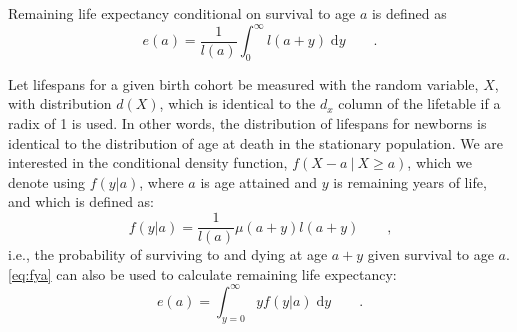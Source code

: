 \documentclass{article}
\newcommand{\dd}{\; \mathrm{d}}
\newcommand{\tc}{\quad\quad\text{,}}
\newcommand{\tp}{\quad\quad\text{.}}
\begin{document}
Remaining life expectancy conditional on survival to age $a$ is defined as
\begin{equation}
e(a) = \frac{1}{l(a)}\int_0^\infty l(a+y) \dd y \tp
\end{equation}

Let lifespans for a given birth cohort be measured with the random variable,
$X$, with distribution $d(X)$, which is identical to the $d_x$
column of the lifetable if a radix of 1 is used. In other words, the
distribution of lifespans for newborns is identical to the distribution of
age at death in the stationary population. We are interested in the
conditional density function, $f(X-a ~|~ X \ge a)$, which we denote using
$f(y|a)$, where $a$ is age attained and $y$ is remaining years of life, and
which is defined as:
\begin{equation}
\label{eq:fya}
f(y|a) = \frac{1}{l(a)} \mu(a+y) l(a+y) \tc
\end{equation}
i.e., the probability of surviving to and dying at age $a+y$ given survival to
age $a$. \eqref{eq:fya} can also be used to calculate remaining life expectancy:
\begin{equation}
e(a) = \int _{y=0}^\infty y f(y|a) \dd y \tp
\end{equation}
\end{document}
